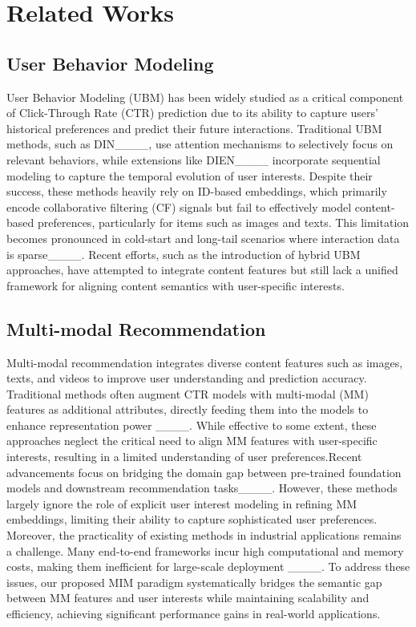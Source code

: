 \section{Related Works}
\label{sec:Related Work}
\subsection{User Behavior Modeling}
User Behavior Modeling (UBM) has been widely studied as a critical component of Click-Through Rate (CTR) prediction due to its ability to capture users' historical preferences and predict their future interactions. Traditional UBM methods, such as DIN____, use attention mechanisms to selectively focus on relevant behaviors, while extensions like DIEN____ incorporate sequential modeling to capture the temporal evolution of user interests. Despite their success, these methods heavily rely on ID-based embeddings, which primarily encode collaborative filtering (CF) signals but fail to effectively model content-based preferences, particularly for items such as images and texts. This limitation becomes pronounced in cold-start and long-tail scenarios where interaction data is sparse____. Recent efforts, such as the introduction of hybrid UBM approaches, have attempted to integrate content features but still lack a unified framework for aligning content semantics with user-specific interests.
\subsection{Multi-modal Recommendation}
Multi-modal recommendation integrates diverse content features such as images, texts, and videos to improve user understanding and prediction accuracy. Traditional methods often augment CTR models with multi-modal (MM) features as additional attributes, directly feeding them into the models to enhance representation power ____. While effective to some extent, these approaches neglect the critical need to align MM features with user-specific interests, resulting in a limited understanding of user preferences.Recent advancements focus on bridging the domain gap between pre-trained foundation models and downstream recommendation tasks____. However, these methods largely ignore the role of explicit user interest modeling in refining MM embeddings, limiting their ability to capture sophisticated user preferences.
Moreover, the practicality of existing methods in industrial applications remains a challenge. Many end-to-end frameworks incur high computational and memory costs, making them inefficient for large-scale deployment ____. 
To address these issues, our proposed MIM paradigm systematically bridges the semantic gap between MM features and user interests while maintaining scalability and efficiency, achieving significant performance gains in real-world applications.


